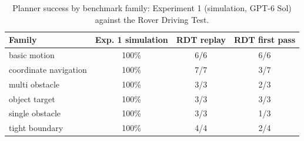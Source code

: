 \begin{table}[htbp]
\centering
\caption{Planner success by benchmark family: Experiment 1 (simulation, GPT-6 Sol) against the Rover Driving Test.}
\label{tab:rdt_family_bridge}
\small
\begin{tabular}{lccc}
\toprule
Family & Exp. 1 simulation & RDT replay & RDT first pass \\
\midrule
basic motion & 100\% & 6/6 & 6/6 \\
coordinate navigation & 100\% & 7/7 & 3/7 \\
multi obstacle & 100\% & 3/3 & 2/3 \\
object target & 100\% & 3/3 & 3/3 \\
single obstacle & 100\% & 3/3 & 1/3 \\
tight boundary & 100\% & 4/4 & 2/4 \\
\bottomrule
\end{tabular}
\end{table}

